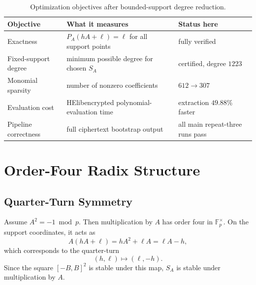 \documentclass[a4paper,runningheads]{llncs}
\newcommand{\Fp}{\mathbb{F}_p}
\newcommand{\HElib}{\textsf{HElib}}
\begin{document}
\begin{table}[t]
\centering
\caption{Optimization objectives after bounded-support degree reduction.}
\label{tab:objective}
\begin{tabular}{p{3.0cm}p{4.5cm}p{4.2cm}}
\toprule
\textbf{Objective} & \textbf{What it measures} & \textbf{Status here} \\
\midrule
Exactness & $P_A(hA+\ell)=\ell$ for all support points & fully verified \\
Fixed-support degree & minimum possible degree for chosen $S_A$ & certified, degree $1223$ \\
Monomial sparsity & number of nonzero coefficients & $612\rightarrow307$ \\
Evaluation cost & \HElib encrypted polynomial-evaluation time & extraction $49.88\%$ faster \\
Pipeline correctness & full ciphertext bootstrap output & all main repeat-three runs pass \\
\bottomrule
\end{tabular}
\end{table}

\section{Order-Four Radix Structure}
\label{sec:order4}

\subsection{Quarter-Turn Symmetry}

Assume $A^2=-1\bmod p$.  Then multiplication by $A$ has order four in
$\Fp^\times$.  On the support coordinates, it acts as
\[
  A(hA+\ell)=hA^2+\ell A=\ell A-h,
\]
which corresponds to the quarter-turn
\[
  (h,\ell)\mapsto(\ell,-h).
\]
Since the square $[-B,B]^2$ is stable under this map, $S_A$ is stable under
multiplication by $A$.
\end{document}
